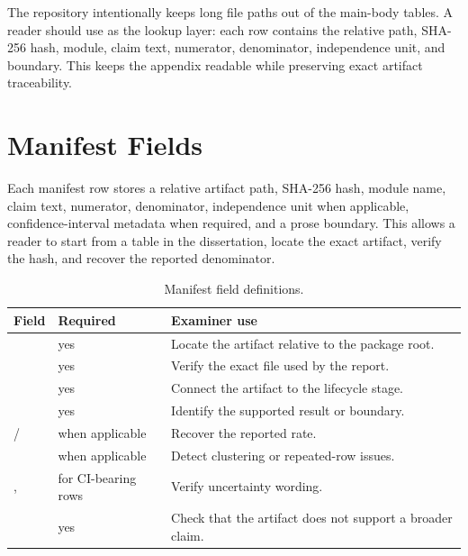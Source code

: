 The repository intentionally keeps long file paths out of the main-body tables. A reader should use  as the lookup layer: each row contains the relative path, SHA-256 hash, module, claim text, numerator, denominator, independence unit, and boundary. This keeps the appendix readable while preserving exact artifact traceability.

\section{Manifest Fields}

Each manifest row stores a relative artifact path, SHA-256 hash, module name, claim text, numerator, denominator, independence unit when applicable, confidence-interval metadata when required, and a prose boundary. This allows a reader to start from a table in the dissertation, locate the exact artifact, verify the hash, and recover the reported denominator.

\begin{table}[htbp]
\centering
\caption{Manifest field definitions.}
\label{tab:manifest-field-definitions}
\tighttable
\begin{tabularx}{\textwidth}{@{}L{2.25cm}L{1.55cm}Y@{}}
\toprule
Field & Required & Examiner use \\
\midrule
{} & yes & Locate the artifact relative to the package root. \\
 & yes & Verify the exact file used by the report. \\
 & yes & Connect the artifact to the lifecycle stage. \\
 & yes & Identify the supported result or boundary. \\
/ & when applicable & Recover the reported rate. \\
 & when applicable & Detect clustering or repeated-row issues. \\
,  & for CI-bearing rows & Verify uncertainty wording. \\
 & yes & Check that the artifact does not support a broader claim. \\
\bottomrule
\end{tabularx}
\end{table}

